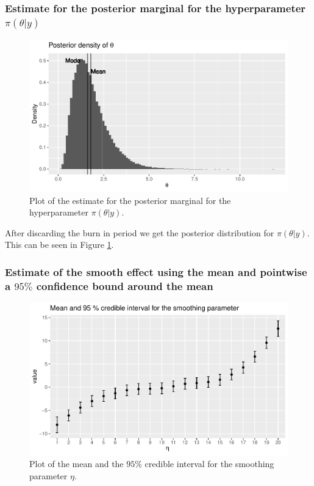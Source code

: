 \subsubsection{Estimate for the posterior marginal for the hyperparameter $\pi(\theta|y)$}

\begin{figure}[H]
    \centering
    \includegraphics[width=\textwidth]{Images/post_theta_mcmc.pdf}
    \caption{Plot of the estimate for the posterior marginal for the hyperparameter $\pi(\theta|y)$.}
    \label{fig:post_theta_mcmc}
\end{figure}

After discarding the burn in period we get the posterior distribution for $\pi(\theta|y)$. This can be seen in Figure \ref{fig:post_theta_mcmc}. 

\subsubsection{Estimate of the smooth effect using the mean and pointwise a $95 \%$ confidence bound around the mean}

\begin{figure}[h]
    \centering
    \includegraphics[width=\textwidth]{Images/post_eta_mcmc.pdf}
    \caption{Plot of the mean and the $95\%$ credible interval for the smoothing parameter $\eta$. }
    \label{fig:post_eta_mcmc}
\end{figure}

